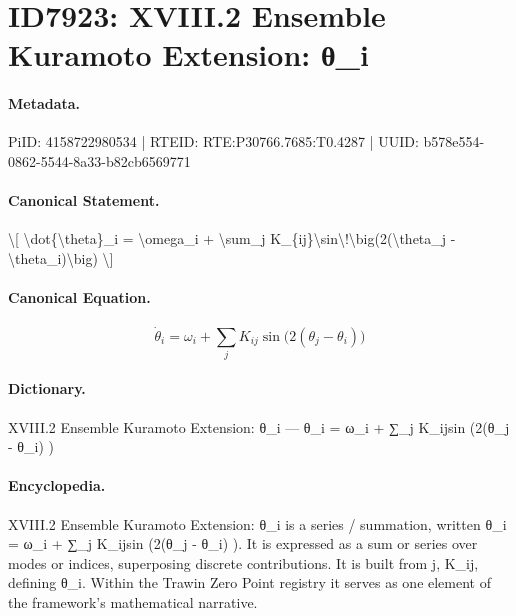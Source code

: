 \section*{ID7923: XVIII.2 Ensemble Kuramoto Extension: θ\_i}
\paragraph{Metadata.}
PiID: 4158722980534 | RTEID: RTE:P30766.7685:T0.4287 | UUID: b578e554-0862-5544-8a33-b82cb6569771

\paragraph{Canonical Statement.}
\textbackslash{}[ \textbackslash{}dot\{\textbackslash{}theta\}\_i = \textbackslash{}omega\_i + \textbackslash{}sum\_j K\_\{ij\}\textbackslash{}sin\textbackslash{}!\textbackslash{}big(2(\textbackslash{}theta\_j - \textbackslash{}theta\_i)\textbackslash{}big) \textbackslash{}]

\paragraph{Canonical Equation.}
\[
\dot{\theta}_i = \omega_i + \sum_j K_{ij}\sin\!\big(2(\theta_j - \theta_i)\big)
\]

\paragraph{Dictionary.}
XVIII.2 Ensemble Kuramoto Extension: θ\_i — θ\_i = ω\_i + ∑\_j K\_ijsin (2(θ\_j - θ\_i) )

\paragraph{Encyclopedia.}
XVIII.2 Ensemble Kuramoto Extension: θ\_i is a series / summation, written θ\_i = ω\_i + ∑\_j K\_ijsin (2(θ\_j - θ\_i) ). It is expressed as a sum or series over modes or indices, superposing discrete contributions. It is built from j, K\_ij, defining θ\_i. Within the Trawin Zero Point registry it serves as one element of the framework's mathematical narrative.
